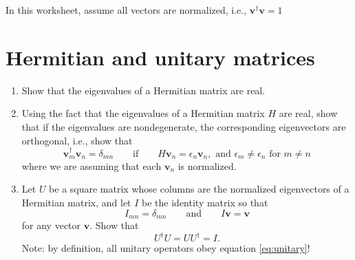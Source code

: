 \documentclass{article}
\begin{document}
\pagestyle{fancy}
\fancyhf{}
\rfoot{\thepage}
\renewcommand{\headrulewidth}{0pt}
\noindent *In this worksheet, assume all vectors are normalized, i.e., $\mathbf{v}^\dagger\mathbf{v} = 1$
\section{Hermitian and unitary matrices}
  \begin{enumerate}[label=(\alph*)]
      \item Show that the eigenvalues of a Hermitian matrix are real.
      \vspace{3cm}
      \item Using the fact that the eigenvalues of a Hermitian matrix $H$ are real, show that if the eigenvalues are nondegenerate, the corresponding eigenvectors are orthogonal, i.e., show that
      \begin{equation}
      \mathbf{v}^\dagger_m\mathbf{v}_n = \delta_{mn}
      \qquad\text{if}\qquad
      H\mathbf{v}_n = \epsilon_n\mathbf{v}_n,
      \text{  and  }
      \epsilon_m \neq\epsilon_n
      \text{  for  }
      m\neq n
      \end{equation}
      \vspace{4cm}
      where we are assuming that each $\mathbf{v}_n$ is normalized.
      \item Let $U$ be a square matrix whose columns are the normalized eigenvectors of a Hermitian matrix, and let $I$ be the identity matrix so that
      \begin{equation}
          I_{mn} = \delta_{mn}
          \qquad\text{and}\qquad
          I\mathbf{v} = \mathbf{v}
      \end{equation}
      for any vector $\mathbf{v}$. Show that
      \begin{equation}
          \label{eq:unitary}
          U^\dagger U = UU^\dagger = I.
      \end{equation}
      \vspace{2cm}
      Note: by definition, all unitary operators obey equation \ref{eq:unitary}!
  \end{enumerate}
\newpage
\end{document}
